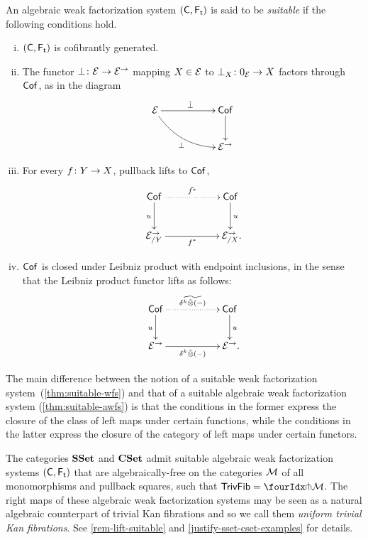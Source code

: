 \documentclass[reqno,10pt,a4paper,oneside,draft]{amsart}
\begin{document}
{{\begin{definition} \label{thm:suitable-awfs}
An algebraic weak factorization system $(\CC, \TF)$ is said to be \emph{suitable} if the following conditions hold.
\begin{enumerate}[(i)]
\item $(\CC, \TF)$ is cofibrantly generated.
\item The functor $\bot \co \cal{E} \to \cal{E}^\to$ mapping $X \in \cal{E}$ to $\bot_X \co 0_{\cal{E}} \to X$ factors through
$\Cof$, as in the diagram
\[
\xymatrix@C+3em{
\catE \ar[r]^{\tilde{\bot}} \ar@/_1pc/[dr]_{\bot} & \Cof \ar[d] \\
  & \catE^\to}
\]
\item For every $f \co Y \to X$, pullback lifts to $\Cof$, 
\[
\xymatrix@C+3em{
  \Cof
  \ar@{.>}[r]^{\tilde{f^*}}
  \ar[d]_{u}
&
  \Cof
  \ar[d]^{u}
\\
  \catE^\to_{/Y}
  \ar[r]_{f^*}
&
  \catE^\to_{/X}
\rlap{.}}
\]
\item $\Cof$ is closed under Leibniz product with endpoint inclusions, in the sense that the Leibniz product functor
lifts as follows:
\[
\xymatrix@C+3em{
  \Cof 
  \ar@{.>}[r]^{\widetilde{\kcyl \hatotimes (-)}}
  \ar[d]_{u}
&
 \Cof
  \ar[d]^{u}
\\
  \catE^\to
  \ar[r]_{\kcyl \hatotimes (-)}
&
  \catE^\to
\rlap{.}}
\]
\end{enumerate}
\end{definition}



The main difference between the notion of a suitable weak factorization system~(\cref{thm:suitable-wfs}) and that of a suitable algebraic
weak factorization system (\cref{thm:suitable-awfs}) is that the conditions in the former express the closure of the class of left maps under certain functions, while the conditions in the latter express the closure of the category of left maps under certain functors. 

\begin{example} \label{unif-triv-fib-sset}
The categories $\SSet$ and $\CSet$ admit suitable algebraic weak factorization systems $(\CC, \TF)$ that are algebraically-free on the
categories $\cal{M}$ of all monomorphisms and pullback squares, \ie such that $\TrivFib = \liftr{\cal{M}}$. The right maps of these algebraic weak factorization systems may
be seen as a natural algebraic counterpart of trivial Kan fibrations and so we call them \emph{uniform trivial Kan fibrations}. See \cref{rem-lift-suitable} and 
\cref{justify-sset-cset-examples} for details. 
\end{example} 


}}
\end{document}
